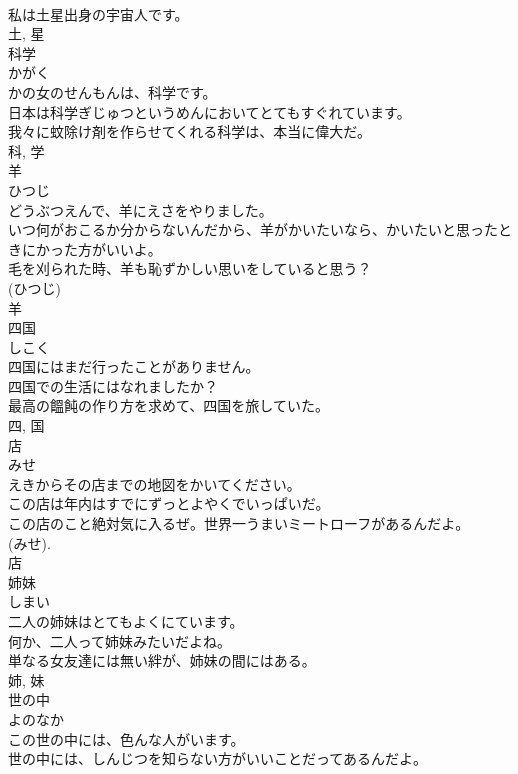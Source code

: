 \documentclass[8pt]{extreport}
\begin{document}
\begin{CJK}{UTF8}{min}
\\	私は土星出身の宇宙人です。	
\\	土, 星	
\\	科学	
\\	かがく	
\\	かの女のせんもんは、科学です。	
\\	日本は科学ぎじゅつというめんにおいてとてもすぐれています。	
\\	我々に蚊除け剤を作らせてくれる科学は、本当に偉大だ。	
\\	科, 学	
\\	羊	
\\	ひつじ	
\\	どうぶつえんで、羊にえさをやりました。	
\\	いつ何がおこるか分からないんだから、羊がかいたいなら、かいたいと思ったときにかった方がいいよ。	
\\	毛を刈られた時、羊も恥ずかしい思いをしていると思う？	
\\	(ひつじ) 
\\	羊	
\\	四国	
\\	しこく	
\\	四国にはまだ行ったことがありません。	
\\	四国での生活にはなれましたか？	
\\	最高の饂飩の作り方を求めて、四国を旅していた。	
\\	四, 国	
\\	店	
\\	みせ	
\\	えきからその店までの地図をかいてください。	
\\	この店は年内はすでにずっとよやくでいっぱいだ。	
\\	この店のこと絶対気に入るぜ。世界一うまいミートローフがあるんだよ。	
\\	(みせ). 
\\	店	
\\	姉妹	
\\	しまい	
\\	二人の姉妹はとてもよくにています。	
\\	何か、二人って姉妹みたいだよね。	
\\	単なる女友達には無い絆が、姉妹の間にはある。	
\\	姉, 妹	
\\	世の中	
\\	よのなか	
\\	この世の中には、色んな人がいます。	
\\	世の中には、しんじつを知らない方がいいことだってあるんだよ。	

\end{CJK}
\end{document}
